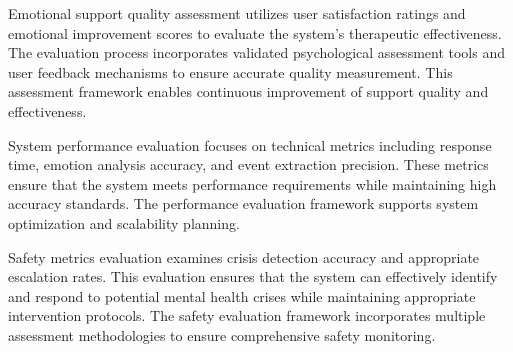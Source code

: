 Emotional support quality assessment utilizes user satisfaction ratings and emotional improvement scores to evaluate the system's therapeutic effectiveness. The evaluation process incorporates validated psychological assessment tools and user feedback mechanisms to ensure accurate quality measurement. This assessment framework enables continuous improvement of support quality and effectiveness.

System performance evaluation focuses on technical metrics including response time, emotion analysis accuracy, and event extraction precision. These metrics ensure that the system meets performance requirements while maintaining high accuracy standards. The performance evaluation framework supports system optimization and scalability planning.

Safety metrics evaluation examines crisis detection accuracy and appropriate escalation rates. This evaluation ensures that the system can effectively identify and respond to potential mental health crises while maintaining appropriate intervention protocols. The safety evaluation framework incorporates multiple assessment methodologies to ensure comprehensive safety monitoring. 